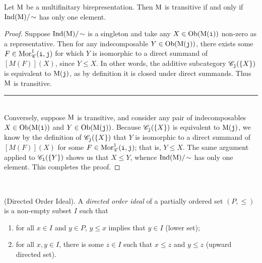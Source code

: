 \noindent\begin{proposition}\label{Transitive2} Let $\textnormal{M}$ be a multifinitary birepresentation. Then $\textnormal{M}$ is transitive if and only if\linebreak $\textnormal{Ind}(\textnormal{M})/\!\sim$ has only one element.\\
\end{proposition}

\noindent\begin{proof} Suppose $\textnormal{Ind}(\textnormal{M})/\!\sim$ is a singleton and take any $X \in \textnormal{Ob}(\textnormal{M}(\textnormal{\texttt{i}}))$ non-zero as a representative. Then for any indecomposable $Y \in \textnormal{Ob}(\textnormal{M}(\textnormal{\texttt{j}}))$, there exists some $F \in \textnormal{Mor}_\mathscr{C}^1(\textnormal{\texttt{i}}, \textnormal{\texttt{j}})$ for which $Y$ is isomorphic to a direct summand of $[M(F)](X)$, since $Y \leq X$. In other words, the additive subcategory $\mathscr{C}_{\textnormal{\texttt{j}}}(\{X\})$ is equivalent to $\textnormal{M}(\textnormal{\texttt{j}})$, as by definition it is closed under direct summands. Thus $\textnormal{M}$ is transitive.\\[-1.5\baselineskip]
\begin{center}
\rule{0.5\linewidth}{1pt}
\end{center}
\noindent\\[-\baselineskip]
\noindent Conversely, suppose $\textnormal{M}$ is transitive, and consider any pair of indecomposables $X \in \textnormal{Ob}(\textnormal{M}(\textnormal{\texttt{i}}))$ and $Y \in \textnormal{Ob}(\textnormal{M}(\textnormal{\texttt{j}}))$. Because $\mathscr{C}_{\textnormal{\texttt{j}}}(\{X\})$ is equivalent to $\textnormal{M}(\textnormal{\texttt{j}})$, we know by the definition of $\mathscr{C}_{\textnormal{\texttt{j}}}(\{X\})$ that $Y$ is isomorphic to a direct summand of $[M(F)](X)$ for some $F \in \textnormal{Mor}_\mathscr{C}^1(\textnormal{\texttt{i}}, \textnormal{\texttt{j}})$; that is, $Y \leq X$. The same argument applied to $\mathscr{C}_{\textnormal{\texttt{i}}}(\{Y\})$ shows us that $X \leq Y$, whence $\textnormal{Ind}(\textnormal{M})/\!\sim$ has only one element. This completes the proof.
\end{proof}\\

\noindent\begin{definition}\textnormal{(Directed Order Ideal).} A {\em directed order ideal} of a partially ordered set $(P, \leq)$ is a non-empty subset $I$ such that
\begin{enumerate}[label=$\bullet$, leftmargin=4\parindent]
\item for all $x \in I$ and $y \in P$, $y \leq x$ implies that $y \in I$ (lower set);
\item for all $x, y \in I$, there is some $z \in I$ such that $x \leq z$ and $y \leq z$ (upward directed set).\\
\end{enumerate}
\end{definition}

